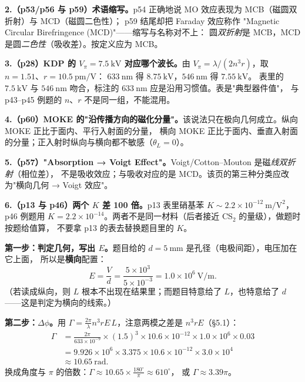 \documentclass[11pt]{ctexart}
\let\hdrorig\hdr
\renewcommand{\hdr}[2]{\needspace{8\baselineskip}\hdrorig{#1}{#2}}
\begin{document}
\textbf{2.（p53/p56 与 p59）术语缩写。}p54 正确地说 MO 效应表现为 MCB（磁圆双折射）与 MCD（磁圆二色性）；
p59 结尾却把 Faraday 效应称作 "Magnetic Circular Birefringence (MCD)"——缩写与名称对不上：
圆\emph{双折射}是 MCB，MCD 是圆\emph{二色性}（吸收差）。按定义应为 MCB。

\textbf{3.（p28）KDP 的 $V_\pi=7.5\ \mathrm{kV}$ 对应哪个波长。}由 $V_\pi=\lambda/(2n^3r)$，取 $n=1.51$、$r=10.5\ \mathrm{pm/V}$：
$633\ \mathrm{nm}$ 得 $8.75\ \mathrm{kV}$，$546\ \mathrm{nm}$ 得 $7.55\ \mathrm{kV}$。
表里的 $7.5\ \mathrm{kV}$ 与 $546\ \mathrm{nm}$ 吻合，标注的 $633\ \mathrm{nm}$ 应是沿用习惯值。表是"典型器件值"，
与 p43--p45 例题的 $n$、$r$ 不是同一组，不能混用。

\textbf{4.（p60）MOKE 的"沿传播方向的磁化分量"。}该说法只在极向几何成立。纵向 MOKE 正比于面内、平行入射面的分量，
横向 MOKE 正比于面内、垂直入射面的分量；正入射时纵向与横向都不敏感（$\theta_L=0$）。

\textbf{5.（p57）"Absorption → Voigt Effect"。}Voigt/Cotton--Mouton 是磁\emph{线双折射}（相位差），
不是吸收效应；与吸收对应的是 MCD。该页的第三种分类应改为"横向几何 → Voigt 效应"。

\textbf{6.（p13 与 p46）两个 $K$ 差 100 倍。}p13 表里硝基苯 $K\sim2.2\times10^{-12}\ \mathrm{m/V^2}$，
p46 例题用 $K=2.2\times10^{-14}$。两者不是同一材料（后者接近 CS$_2$ 的量级），做题时按题给值算，
不要拿 p13 的表去替换题目里的 $K$。



\textbf{第一步：判定几何，写出 $E$。}题目给的 $d=5\ \mathrm{mm}$ 是孔径（电极间距），电压加在它上面，
所以是\textbf{横向}配置：
\begin{equation}
E=\frac{V}{d}=\frac{5\times10^{3}}{5\times10^{-3}}=1.0\times10^{6}\ \mathrm{V/m}.
\end{equation}
（若读成纵向，则 $L$ 根本不出现在结果里；而题目特意给了 $L$，也特意给了 $d$——这是判定为横向的线索。）

\textbf{第二步：$\Delta\phi$。}用 $\Gamma=\frac{2\pi}{\lambda}n^3rE\,L$，注意两模之差是 $n^3rE$（§5.1）：
\begin{align}
\Gamma&=\frac{2\pi}{633\times10^{-9}}\times(1.5)^3\times10.6\times10^{-12}\times1.0\times10^{6}\times0.03 \nonumber\\
&=9.926\times10^{6}\times3.375\times10.6\times10^{-12}\times3.0\times10^{4}\nonumber\\
&\approx10.65\ \mathrm{rad}.
\end{align}
换成角度与 $\pi$ 的倍数：$\Gamma\approx 10.65\times\frac{180^\circ}{\pi}\approx610^\circ$，
或 $\Gamma\approx3.39\pi$。
\end{document}
